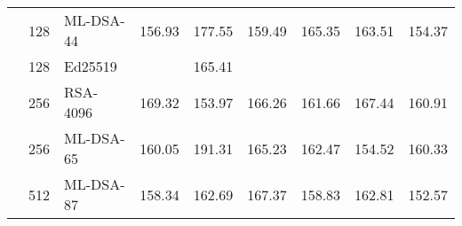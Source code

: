 \begin{table}[ht]
\begin{tabular}{crlrrrrrr}
    & 128 & ML-DSA-44        & 156.93 & 177.55 & 159.49 & 165.35 & 163.51 & 154.37   \\
    & 128 & Ed25519          &       & 165.41 &      &       &      &        \\
    & 256 & RSA-4096         & 169.32 & 153.97 & 166.26 & 161.66 & 167.44 & 160.91   \\
    & 256 & ML-DSA-65        & 160.05 & 191.31 & 165.23 & 162.47 & 154.52 & 160.33   \\
    & 512 & ML-DSA-87        & 158.34 & 162.69 & 167.37 & 158.83 & 162.81 & 152.57   \\
    \bottomrule
  \end{tabular}
  \label{table:performance-verify-traditional-mtss}
\end{table}